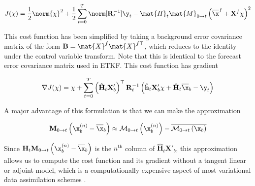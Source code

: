 \begin{equation}
J(\mathbf{\chi}) = \frac 1 2 \norm{\mathbf{\chi}}^2 + \frac 1 2 \sum_{t=0}^T \norm[\mathbf{R}_t^{-1}]{\y_t - \mat{H}_t\mat{M}_{0 \rightarrow t}\left(\overline{\x}^f + \mathbf{X}^f \mathbf{\chi}\right)}^2
\end{equation}

This cost function has been simplified by taking a background error covariance matrix of the form $\mathbf{B} = \mat{X}^f\mat{X}^{f\top}$, which reduces to the identity under the control variable transform. Note that this is identical to the forecast error covariance matrix used in ETKF. This cost function has gradient

\[
\nabla J(\mathbf{\chi}) = \mathbf{\chi} + \sum_{t=0}^T\left(\mathbf{\hat{H}}_t \mathbf{X}'_b\right)^\top \mathbf{R}_t^{-1} \left(\mathbf{\hat{h}}_t \mathbf{X}'_b \chi + \mathbf{\hat{H}}_t \overline{\x}_b - \y_t\right)
\]

A major advantage of this formulation is that we can make the approximation

\[
\mathbf{M}_{0 \rightarrow t} \left( \x^{(n)}_b - \overline{\x}_b \right) \approx \mathcal{M}_{0 \rightarrow t} \left( \x^{(n)}_b \right) - \overline{\mathcal{M}_{0 \rightarrow t} \left( \x_b \right)}
\]

Since $\mathbf{H}_t \mathbf{M}_{0 \rightarrow t} \left( \x^{(n)}_b - \overline{\x}_b \right)$ is the $n^{\text{th}}$ column of $\mathbf{\hat{H}}_t \mathbf{X}'_b$, this approximation allows us to compute the cost function and its gradient without a tangent linear or adjoint model, which is a computationally expensive aspect of most variational data assimilation schemes \citep{Bannister2017}.